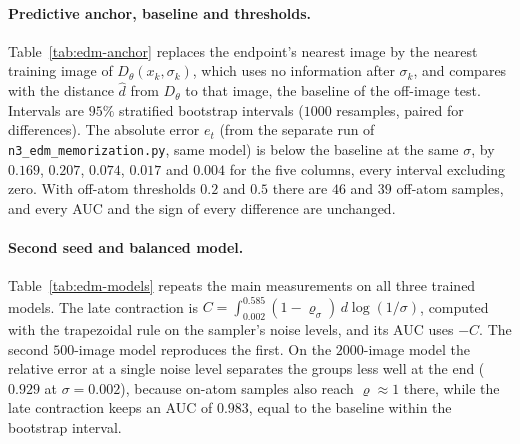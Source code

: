 \documentclass{article} %
\theoremstyle{plain}
\theoremstyle{definition}
\theoremstyle{remark}
\begin{document}
\paragraph{Predictive anchor, baseline and thresholds.} Table~\ref{tab:edm-anchor} replaces the
endpoint's nearest image by the nearest training image of $D_\theta(x_k,\sigma_k)$, which uses no
information after $\sigma_k$, and compares with the distance $\hat d$ from $D_\theta$ to that image,
the baseline of the off-image test. Intervals are $95\%$ stratified bootstrap intervals ($1000$
resamples, paired for differences). The absolute error $e_t$ (from the separate run of
\texttt{n3\_edm\_memorization.py}, same model) is below the baseline at the same $\sigma$, by
$0.169$, $0.207$, $0.074$, $0.017$ and $0.004$ for the five columns, every interval excluding
zero. With off-atom thresholds $0.2$ and $0.5$ there are $46$ and $39$ off-atom samples, and every
AUC and the sign of every difference are unchanged.

\begin{table}[h]
\centering\small
{}
\caption{Predictive anchor and baseline, subset model ($1000$ samples, $41$ off-atom).}
\label{tab:edm-anchor}
\end{table}

\paragraph{Second seed and balanced model.} Table~\ref{tab:edm-models} repeats the main measurements
on all three trained models. The late contraction is
$C=\int_{0.002}^{0.585}(1-\varrho_\sigma)\,d\log(1/\sigma)$, computed with the trapezoidal rule on the
sampler's noise levels, and its AUC uses $-C$. The second $500$-image model reproduces the first. On
the $2000$-image model the relative error at a single noise level separates the groups less well
at the end ($0.929$ at $\sigma=0.002$), because on-atom samples also reach $\varrho\approx1$ there,
while the late contraction keeps an AUC of $0.983$, equal to the baseline within the bootstrap
interval.
\end{document}
